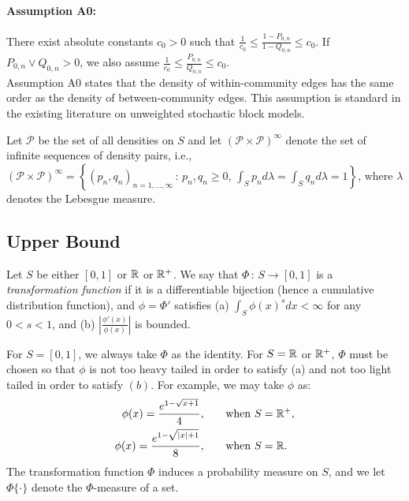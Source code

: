 \documentclass{article}
\begin{document}
\paragraph{\textbf{Assumption A0:}} There exist absolute constants $c_0 > 0$ such that $\frac{1}{c_0} \leq \frac{1-P_{0,n}}{1-Q_{0,n}} \leq c_0$. If $P_{0,n} \vee Q_{0,n} > 0$, we also assume $\frac{1}{c_0} \leq \frac{P_{0,n}}{Q_{0,n}} \leq c_0$.\\

Assumption A0 states that the density of within-community edges has the same order as the density of between-community edges. This assumption is standard in the existing literature on unweighted stochastic block models.



Let $\mathcal{P}$ be the set of all densities on $S$ and let $(\mathcal{P} \times \mathcal{P})^\infty$ denote the set of infinite sequences of density pairs, i.e.,  $(\mathcal{P} \times \mathcal{P})^\infty = \left\{
  (p_n, q_n)_{n = 1,..., \infty} \,:\, p_n, q_n \geq 0,\, \int_S p_n d\lambda = \int_S q_n d\lambda = 1 \right\}$, where $\lambda$ denotes the Lebesgue measure.


\subsection{Upper Bound}

\begin{definition}
Let $S$ be either $[0,1]$ or ${\mathbb R}$ or ${\mathbb R}^+$. We say that $\Phi \,:\, S \rightarrow [0,1]$ is a \emph{transformation function} if it is a differentiable bijection (hence a cumulative distribution function), and $\phi = \Phi'$ satisfies (a) $\int_S \phi(x)^s dx < \infty$ for any $0 < s < 1$, and (b) $\left| \frac{\phi'(x)}{\phi(x)} \right|$ is bounded. 
\end{definition}

For $S = [0,1]$, we always take $\Phi$ as the identity. For $S = {\mathbb R}$ or ${\mathbb R}^+$, $\Phi$ must be chosen so that $\phi$ is not too heavy tailed in order to satisfy (a) and not too light tailed in order to satisfy $(b)$. For example, we may take $\phi$ as:
\begin{align}
\phi(x) = \frac{e^{1-\sqrt{x+1}}}{4},  & 
     \qquad \textrm{when $S = {\mathbb R}^+$}, \label{eqn:phi_defn1} \\ 
\phi(x) = \frac{e^{1-\sqrt{|x|+1}}}{8}, & 
   \qquad \textrm{when $S = {\mathbb R}$.} \label{eqn:phi_defn2}
\end{align}
The transformation function $\Phi$ induces a probability measure on $S$, and we let $\Phi \{ \cdot \}$ denote the $\Phi$-measure of a set.
\end{document}
